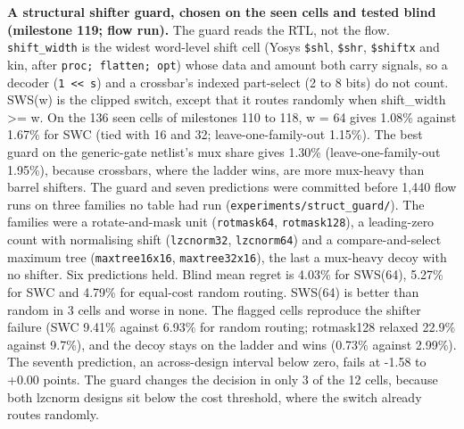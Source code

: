 \documentclass[conference]{IEEEtran}
\begin{document}
\textbf{A structural shifter guard, chosen on the seen cells and tested
blind (milestone 119; flow run).} The guard reads the RTL, not the flow.
\texttt{shift\_\allowbreak{}width} is the widest word-level shift cell (Yosys
\texttt{\$shl}, \texttt{\$shr}, \texttt{\$shiftx} and kin, after
\texttt{proc;\ flatten;\ opt}) whose data and amount both carry signals,
so a decoder (\texttt{1\ \textless{}\textless{}\ s}) and a crossbar's
indexed part-select (2 to 8 bits) do not count. SWS(w) is the clipped
switch, except that it routes randomly when shift\_width \textgreater=
w. On the 136 seen cells of milestones 110 to 118, w = 64 gives 1.08\%
against 1.67\% for SWC (tied with 16 and 32; leave-one-family-out
1.15\%). The best guard on the generic-gate netlist's mux share gives
1.30\% (leave-one-family-out 1.95\%), because crossbars, where the
ladder wins, are more mux-heavy than barrel shifters. The guard and
seven predictions were committed before 1,440 flow runs on three
families no table had run (\texttt{experiments/\allowbreak{}struct\_\allowbreak{}guard/\allowbreak{}}). The
families were a rotate-and-mask unit (\texttt{rotmask64},
\texttt{rotmask128}), a leading-zero count with normalising shift
(\texttt{lzcnorm32}, \texttt{lzcnorm64}) and a compare-and-select
maximum tree (\texttt{maxtree16x16}, \texttt{maxtree32x16}), the last a
mux-heavy decoy with no shifter. Six predictions held. Blind mean regret
is 4.03\% for SWS(64), 5.27\% for SWC and 4.79\% for equal-cost random
routing. SWS(64) is better than random in 3 cells and worse in none. The
flagged cells reproduce the shifter failure (SWC 9.41\% against 6.93\%
for random routing; rotmask128 relaxed 22.9\% against 9.7\%), and the
decoy stays on the ladder and wins (0.73\% against 2.99\%). The seventh
prediction, an across-design interval below zero, fails at -1.58 to
+0.00 points. The guard changes the decision in only 3 of the 12 cells,
because both lzcnorm designs sit below the cost threshold, where the
switch already routes randomly.
\end{document}
